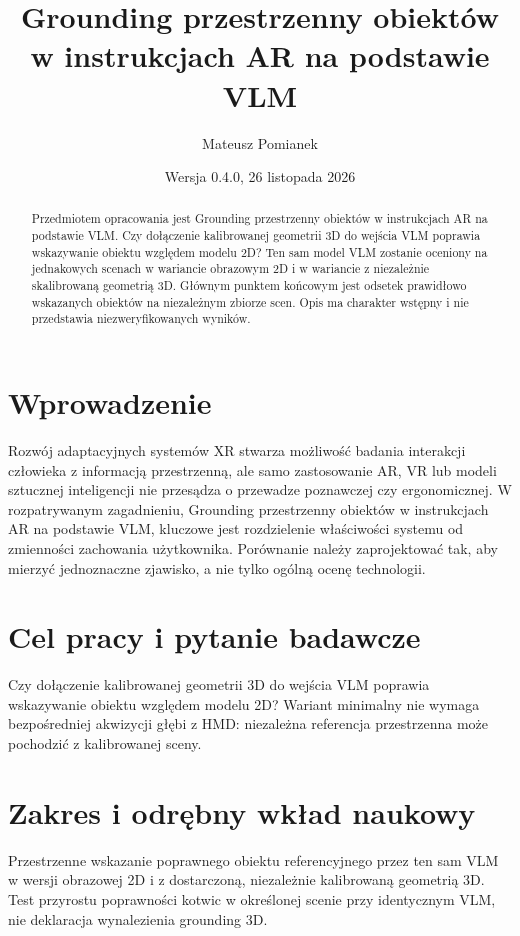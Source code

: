 \documentclass[11pt,a4paper]{article}
\title{Grounding przestrzenny obiektów w instrukcjach AR na podstawie VLM}
\author{Mateusz Pomianek}
\date{Wersja 0.4.0, 26 listopada 2026}
\begin{document}
\maketitle

\begin{abstract}

Przedmiotem opracowania jest Grounding przestrzenny obiektów w instrukcjach AR na podstawie VLM. Czy dołączenie kalibrowanej geometrii 3D do wejścia VLM poprawia wskazywanie obiektu względem modelu 2D? Ten sam model VLM zostanie oceniony na jednakowych scenach w wariancie obrazowym 2D i w wariancie z niezależnie skalibrowaną geometrią 3D. Głównym punktem końcowym jest odsetek prawidłowo wskazanych obiektów na niezależnym zbiorze scen. Opis ma charakter wstępny i nie przedstawia niezweryfikowanych wyników.

\end{abstract}

\section{Wprowadzenie}

Rozwój adaptacyjnych systemów XR stwarza możliwość badania interakcji człowieka z informacją przestrzenną, ale samo zastosowanie AR, VR lub modeli sztucznej inteligencji nie przesądza o przewadze poznawczej czy ergonomicznej. W rozpatrywanym zagadnieniu, Grounding przestrzenny obiektów w instrukcjach AR na podstawie VLM, kluczowe jest rozdzielenie właściwości systemu od zmienności zachowania użytkownika. Porównanie należy zaprojektować tak, aby mierzyć jednoznaczne zjawisko, a nie tylko ogólną ocenę technologii.

\section{Cel pracy i pytanie badawcze}

Czy dołączenie kalibrowanej geometrii 3D do wejścia VLM poprawia wskazywanie obiektu względem modelu 2D? Wariant minimalny nie wymaga bezpośredniej akwizycji głębi z HMD: niezależna referencja przestrzenna może pochodzić z kalibrowanej sceny.

\section{Zakres i odrębny wkład naukowy}
Przestrzenne wskazanie poprawnego obiektu referencyjnego przez ten sam VLM w wersji obrazowej 2D i z dostarczoną, niezależnie kalibrowaną geometrią 3D. Test przyrostu poprawności kotwic w określonej scenie przy identycznym VLM, nie deklaracja wynalezienia grounding 3D.
\end{document}
